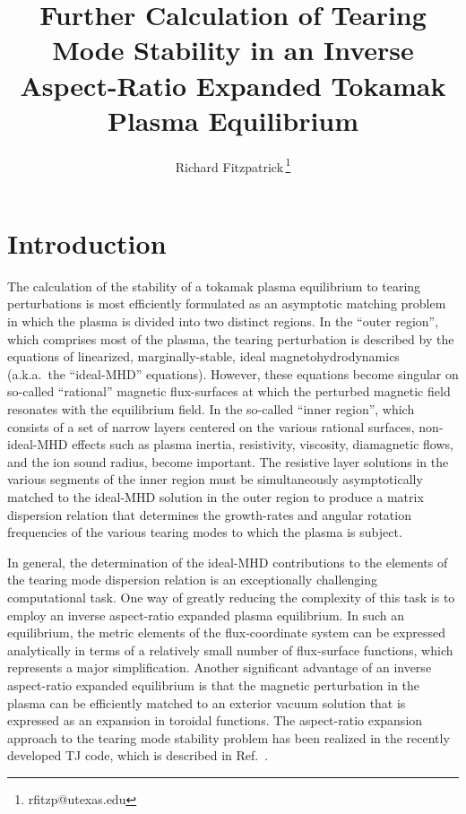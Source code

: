 \documentclass[12pt,prb,aps]{revtex4-1}
\begin{document}
\title{Further Calculation of Tearing Mode Stability in an Inverse Aspect-Ratio Expanded Tokamak Plasma Equilibrium}
\author{Richard Fitzpatrick\,\footnote{rfitzp@utexas.edu}}

\begin{abstract}

\end{abstract}
\maketitle

\section{Introduction} 
The calculation of the stability of a tokamak plasma equilibrium to tearing perturbations is most efficiently formulated as  an asymptotic
matching problem in which the  plasma is  divided into two distinct regions.\cite{fkr}  In the ``outer region'', which comprises most
of the plasma, the tearing perturbation is described by the equations of linearized, marginally-stable, ideal magnetohydrodynamics (a.k.a.\ the ``ideal-MHD'' equations). 
However, these equations become singular on so-called ``rational'' magnetic flux-surfaces at which the perturbed magnetic field resonates with the equilibrium field. In the so-called ``inner region'', which
consists of a set of narrow layers centered on the various rational surfaces, non-ideal-MHD effects such as plasma inertia, resistivity, 
viscosity,  diamagnetic flows, and the ion sound radius,  become important.  The resistive layer
solutions in the various segments of the inner region must be simultaneously asymptotically matched to the ideal-MHD solution in the outer region to produce a matrix 
dispersion relation that determines the growth-rates and angular rotation frequencies of the various tearing modes to which the plasma is subject.\cite{con0,cht}

In general, the  determination of the ideal-MHD contributions to the elements of the  tearing mode dispersion relation is an exceptionally challenging computational task.\cite{connor,nish,gal,pletz,pletz1,
tokuda,brennan,ham,ham1,ham2,am1,am2,am3,aglas,aglas1,aglas2}
One way of greatly reducing the complexity of this task is to employ an inverse aspect-ratio expanded plasma equilibrium.\cite{greene,gim,inverse} In such an equilibrium,
the metric elements of the flux-coordinate system can be expressed analytically in terms of a relatively small number of  flux-surface functions,
which represents a major simplification.\cite{con0} Another significant advantage of an inverse aspect-ratio expanded equilibrium is that the magnetic perturbation in the plasma can be efficiently 
matched to an exterior vacuum solution  that is expressed as an expansion in toroidal functions.\cite{am1} The aspect-ratio expansion approach to the tearing mode stability problem has been realized in the recently developed TJ code,
which is described in Ref.~.
\end{document}

